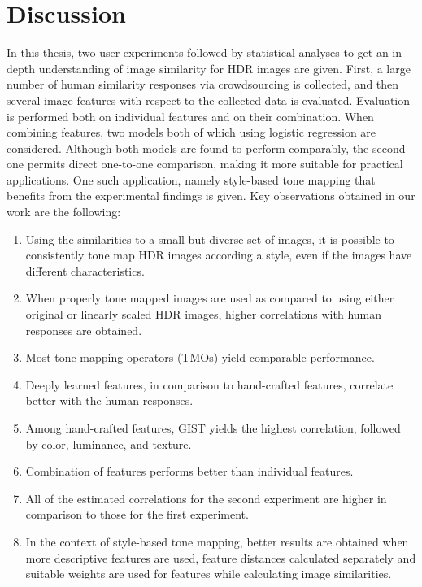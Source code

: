 \chapter{Discussion}
\label{chp:b7}

In this thesis, two user experiments followed by statistical analyses to get an in-depth understanding of image similarity for HDR
images are given. First, a large number of human similarity responses via crowdsourcing is collected, and then several image features with respect to the collected data is evaluated. Evaluation is performed both on individual features and on their combination. When combining features, two models both of which using logistic regression are considered. Although both models are found to perform comparably, the second one permits direct one-to-one comparison, making it more suitable for practical applications. One such application, namely style-based tone mapping that benefits from the experimental findings is given. Key observations obtained in our work are the following:
%
\begin{enumerate}
\item Using the similarities to a small but diverse set of images, it is possible to consistently tone map HDR images according a style, even if the images have different characteristics.
\item When properly tone mapped images are used as compared to using either original or linearly scaled HDR images, higher correlations with human responses are obtained.
\item Most tone mapping operators (TMOs) yield comparable performance.
\item Deeply learned features, in comparison to hand-crafted features, correlate better with the human responses.
\item Among hand-crafted features, GIST yields the highest correlation, followed by color, luminance, and texture.
\item Combination of features performs better than individual features.
\item All of the estimated correlations for the second experiment are higher in comparison to those for the first experiment.
\item In the context of style-based tone mapping, better results are obtained when more descriptive features are used, feature distances calculated separately and suitable weights are used for features while calculating image similarities.
\end{enumerate}

